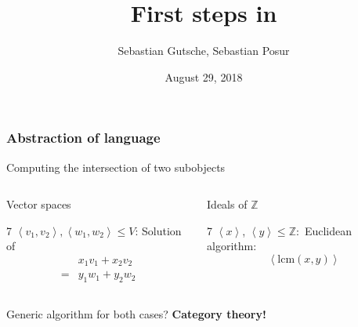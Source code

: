 \documentclass{beamer}
\title[\CapPkg]{First steps in \CapPkg}
\author[Gutsche, Posur]{Sebastian Gutsche, Sebastian Posur}
\date[August 29, 2018]{August 29, 2018}
\institute[Siegen]{Siegen University}
\newcommand{\Z}{\mathbb{Z}}
\begin{document}
\begin{frame}[fragile]
\titlepage
\end{frame}

\begin{frame}[fragile]
 \frametitle{Abstraction of language}
 \begin{block}{Computing the intersection of two subobjects}
  \begin{columns}[onlytextwidth, t]
  \pause
  \begin{block}{Vector spaces}
  \begin{overlayarea}{\linewidth}{7\baselineskip}
  $\left\langle v_1, v_2 \right\rangle, \left\langle w_1, w_2 \right\rangle \leq V$:\newline \pause
  Solution of
  \begin{align*}
   & x_1v_1 + x_2 v_2 \\
   = & y_1w_1 +y_2w_2
  \end{align*}
  \end{overlayarea}
  \end{block} \pause
  \begin{block}{Ideals of $\mathbb{Z}$\vphantom{Vector spaces}} \pause
  \begin{overlayarea}{\linewidth}{7\baselineskip}
  $\left\langle x\right\rangle$, $\left\langle y\right\rangle \leq \Z:$\newline \pause
  Euclidean algorithm:
  \[
   \left\langle \mathrm{lcm} \left( x,y \right) \right\rangle
  \]
  
  \end{overlayarea}
  \end{block}\pause
  \end{columns}
 \begin{center}
 Generic algorithm for both cases? \pause
 \textbf{Category theory!}
 \end{center}
 \end{block}
\end{frame}
\end{document}
